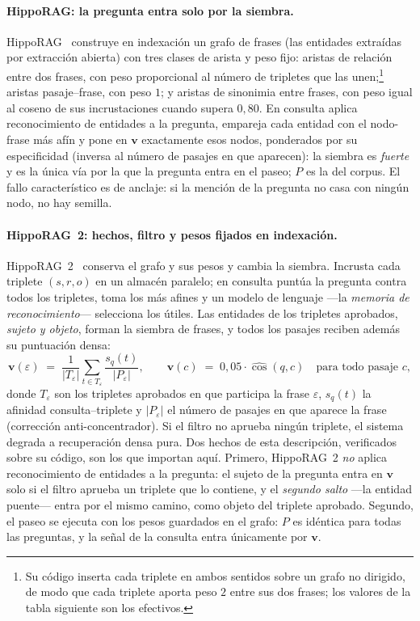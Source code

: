 \documentclass[11pt,a4paper]{article}
\newcommand{\hippo}{HippoRAG~2}
\begin{document}
\paragraph{HippoRAG: la pregunta entra solo por la siembra.}
HippoRAG~\cite{hipporag} construye en indexación un grafo de frases
(las entidades extraídas por extracción abierta) con tres clases de arista
y peso fijo: aristas de relación entre dos frases, con peso proporcional
al número de tripletes que las unen;\footnote{Su código inserta cada
triplete en ambos sentidos sobre un grafo no dirigido, de modo que cada
triplete aporta peso $2$ entre sus dos frases; los valores de la tabla
siguiente son los efectivos.} aristas pasaje--frase, con peso $1$; y
aristas de sinonimia entre frases, con peso igual al coseno de sus
incrustaciones cuando supera $0{,}80$. En consulta aplica reconocimiento
de entidades a la pregunta, empareja cada entidad con el nodo-frase más
afín y pone en $\mathbf{v}$ exactamente esos nodos, ponderados por su
especificidad (inversa al número de pasajes en que aparecen): la siembra
es \emph{fuerte} y es la única vía por la que la pregunta entra en el
paseo; $P$ es la del corpus. El fallo característico es de anclaje: si
la mención de la pregunta no casa con ningún nodo, no hay semilla.

\paragraph{\hippo{}: hechos, filtro y pesos fijados en indexación.}
\hippo{}~\cite{hipporag2} conserva el grafo y sus pesos y cambia la
siembra. Incrusta cada triplete $(s,r,o)$ en un almacén paralelo; en
consulta puntúa la pregunta contra todos los tripletes, toma los más
afines y un modelo de lenguaje ---la \emph{memoria de reconocimiento}---
selecciona los útiles. Las entidades de los tripletes aprobados,
\emph{sujeto y objeto}, forman la siembra de frases, y todos los pasajes
reciben además su puntuación densa:
\begin{equation}
\mathbf{v}(\varepsilon) \;=\;
\frac{1}{|T_\varepsilon|}\sum_{t\in T_\varepsilon}\frac{s_q(t)}{|P_\varepsilon|},
\qquad
\mathbf{v}(c) \;=\; 0{,}05\cdot\widehat{\cos}(q,c)\quad\text{para todo pasaje } c,
\label{eq:siembra-hippo}
\end{equation}
donde $T_\varepsilon$ son los tripletes aprobados en que participa la
frase $\varepsilon$, $s_q(t)$ la afinidad consulta--triplete y
$|P_\varepsilon|$ el número de pasajes en que aparece la frase
(corrección anti-concentrador). Si el filtro no aprueba ningún triplete,
el sistema degrada a recuperación densa pura. Dos hechos de esta
descripción, verificados sobre su código, son los que importan aquí.
Primero, \hippo{} \emph{no} aplica reconocimiento de entidades a la
pregunta: el sujeto de la pregunta entra en $\mathbf{v}$ solo si el filtro
aprueba un triplete que lo contiene, y el \emph{segundo salto} ---la
entidad puente--- entra por el mismo camino, como objeto del triplete
aprobado. Segundo, el paseo se ejecuta con los pesos guardados en el
grafo: $P$ es idéntica para todas las preguntas, y la señal de la consulta
entra únicamente por $\mathbf{v}$.
\end{document}
